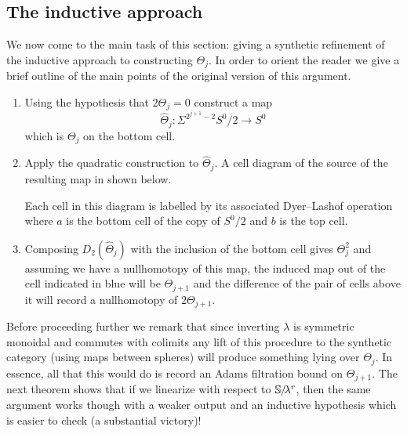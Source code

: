 \subsection{The inductive approach}
\label{subsec:inductive}\hfill

We now come to the main task of this section: giving a synthetic refinement of the inductive approach to constructing $\Theta_j$. In order to orient the reader we give a brief outline of the main points of the original version of this argument. %

\begin{enumerate}
\item Using the hypothesis that $2\Theta_j = 0$ construct a map
  \[ \widehat{\Theta}_j : \Sigma^{2^{j+1}-2} S^0/2 \to S^0 \]
  which is $\Theta_j$ on the bottom cell.
\item Apply the quadratic construction to $\widehat{\Theta}_j$.
  A cell diagram of the source of the resulting map in shown below.
  \begin{center}  \end{center}
  Each cell in this diagram is labelled by its associated Dyer--Lashof operation where $a$ is the bottom cell of the copy of $S^0/2$ and $b$ is the top cell.
\item Composing $D_2(\widehat{\Theta}_j)$ with the inclusion of the bottom cell gives $\Theta_j^2$ and assuming we have a nullhomotopy of this map, the induced map out of the cell indicated in blue will be $\Theta_{j+1}$ and the difference of the pair of cells above it will record a nullhomotopy of $2\Theta_{j+1}$.
\end{enumerate}

Before proceeding further we remark that since inverting $\lambda$ is symmetric monoidal and commutes with colimits any lift of this procedure to the synthetic category (using maps between spheres) will produce something lying over $\Theta_j$. In essence, all that this would do is record an Adams filtration bound on $\Theta_{j+1}$. The next theorem shows that if we linearize with respect to $\operatorname{\mathbb{S}}\hspace{-2.2pt}/\!\lambda^r$, then the same argument works though with a weaker output and an inductive hypothesis which is easier to check (a substantial victory)!

